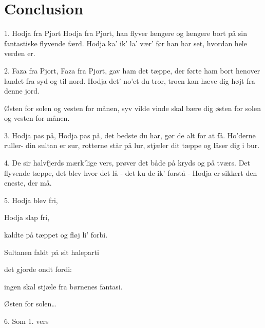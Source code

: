 \chapter{Conclusion}\label{chap:conclusion}
1. Hodja fra Pjort 
Hodja fra Pjort, 
han flyver længere og længere bort 
på sin fantastiske flyvende færd. 
Hodja ka’ ik’ la’ vær’ 
før han har set, hvordan hele verden er. 



2. Faza fra Pjort, 
Faza fra Pjort, 
gav ham det tæppe, der førte ham bort 
henover landet fra syd og til nord. 
Hodja det’ no’et du tror, 
troen kan hæve dig højt fra denne jord. 



Østen for solen og vesten for månen, 
syv vilde vinde skal bære dig 
østen for solen og vesten for månen. 

3. Hodja pas på, 
Hodja pas på, 
det bedste du har, gør de alt for at få. 
Ho’derne ruller- din sultan er sur, 
rotterne står på lur, 
stjæler dit tæppe og låser dig i bur. 


4. De sir halvfjerds 
mærk’lige vers, 
prøver det både på kryds og på tværs. 
Det flyvende tæppe, det blev hvor det lå 
- det ku de ik’ forstå - 
Hodja er sikkert den eneste, der må. 


5. Hodja blev fri, 

Hodja slap fri, 

kaldte på tæppet og fløj li’ forbi. 

Sultanen faldt på sit haleparti 

det gjorde ondt fordi: 

ingen skal stjæle fra børnenes fantasi. 



Østen for solen…



6. Som 1. vers 


